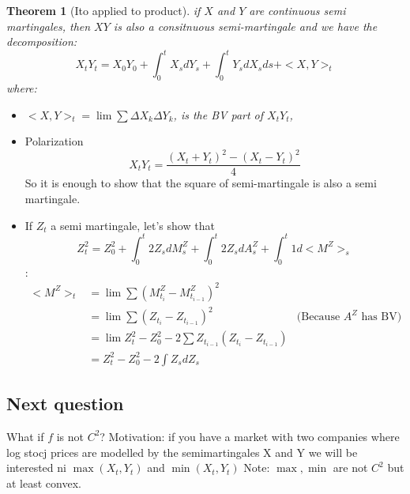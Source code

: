 \documentclass{article}
\newtheorem{theorem}{Theorem}
\begin{document}
\begin{theorem}[Ito applied to product]
  if $X$ and $Y$ are continuous semi martingales, then $XY$ is also a consitnuous semi-martingale and we have the decomposition:
  $$X_t Y_t = X_0 Y_0 + \int_0^t X_s dY_s + \int_0^t Y_s dX_sds + <X, Y>_t$$ where:
  \begin{itemize}
  \item $<X, Y>_t = \lim \sum \Delta X_k \Delta Y_k$, is the BV part of $X_t Y_t$, 
  \end{itemize}
\end{theorem}
\begin{itemize}
\item Polarization $$X_tY_t = \frac{(X_t + Y_t)^2 - (X_t - Y_t)^2}4$$
  So it is enough to show that the square of semi-martingale is also a
  semi martingale.
\item If $Z_t$ a semi martingale, let's show that $$Z_t^2 = Z_0^2 + \int_0^t2Z_s dM_s^Z + \int_0^t 2 Z_s dA_s^Z + \int_0^t 1 d<M^Z>_s$$:
  \begin{align*}
    <M^Z>_t &= \lim \sum (M^Z_{t_i} - M^Z_{t_{i-1}})^2
    \\&= \lim \sum (Z_{t_i} - Z_{t_{i-1}})^2 & \text{(Because $A^Z$ has BV)}
    \\&= \lim Z_t^2 - Z_0^2 -2 \sum Z_{t_{i-1}}(Z_{t_i} - Z_{t_{i-1}})
    \\&= Z_t^2 - Z_0^2 -2 \int Z_s dZ_s
  \end{align*}
\end{itemize}


\subsection{Next question}
What if $f$ is not $C^2$?
Motivation: if you have a market with two companies where log stocj prices are modelled by the semimartingales X and Y we will be interested ni
$\max(X_t, Y_t)$ and $\min(X_t, Y_t)$
Note: $\max, \min$ are not $C^2$ but at least convex.
\end{document}
